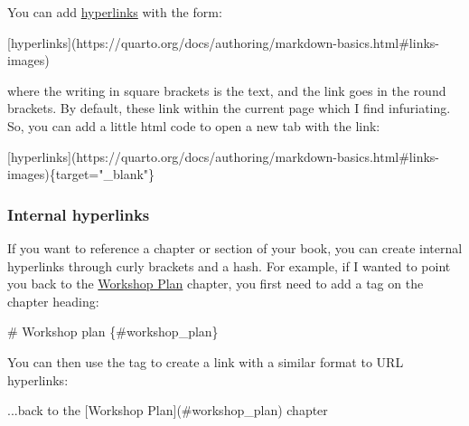 \documentclass[
  letterpaper,
  DIV=11,
  numbers=noendperiod]{scrreprt}
\newenvironment{Shaded}{\begin{snugshade}}{\end{snugshade}}
\newcommand{\CommentTok}[1]{\textcolor[rgb]{0.37,0.37,0.37}{#1}}
\newcommand{\ErrorTok}[1]{\textcolor[rgb]{0.68,0.00,0.00}{#1}}
\newcommand{\NormalTok}[1]{\textcolor[rgb]{0.00,0.23,0.31}{#1}}
\newcommand{\SpecialCharTok}[1]{\textcolor[rgb]{0.37,0.37,0.37}{#1}}
\begin{document}
You can add
\href{https://quarto.org/docs/authoring/markdown-basics.html\#links-images}{hyperlinks}
with the form:

\begin{Shaded}
\begin{Highlighting}[]
\NormalTok{[hyperlinks](https}\SpecialCharTok{:}\ErrorTok{//}\NormalTok{quarto.org}\SpecialCharTok{/}\NormalTok{docs}\SpecialCharTok{/}\NormalTok{authoring}\SpecialCharTok{/}\NormalTok{markdown}\SpecialCharTok{{-}}\NormalTok{basics.html}\CommentTok{\#links{-}images)}
\end{Highlighting}
\end{Shaded}

where the writing in square brackets is the text, and the link goes in
the round brackets. By default, these link within the current page which
I find infuriating. So, you can add a little html code to open a new tab
with the link:

\begin{Shaded}
\begin{Highlighting}[]
\NormalTok{[hyperlinks](https}\SpecialCharTok{:}\ErrorTok{//}\NormalTok{quarto.org}\SpecialCharTok{/}\NormalTok{docs}\SpecialCharTok{/}\NormalTok{authoring}\SpecialCharTok{/}\NormalTok{markdown}\SpecialCharTok{{-}}\NormalTok{basics.html}\CommentTok{\#links{-}images)\{target="\_blank"\}}
\end{Highlighting}
\end{Shaded}

\subsubsection{Internal hyperlinks}\label{internal-hyperlinks}

If you want to reference a chapter or section of your book, you can
create internal hyperlinks through curly brackets and a hash. For
example, if I wanted to point you back to the
\hyperref[workshop_plan]{Workshop Plan} chapter, you first need to add a
tag on the chapter heading:

\begin{Shaded}
\begin{Highlighting}[]
\CommentTok{\# Workshop plan \{\#workshop\_plan\}}
\end{Highlighting}
\end{Shaded}

You can then use the tag to create a link with a similar format to URL
hyperlinks:

\begin{Shaded}
\begin{Highlighting}[]
\NormalTok{...back to the [Workshop Plan](}\CommentTok{\#workshop\_plan) chapter}
\end{Highlighting}
\end{Shaded}
\end{document}
